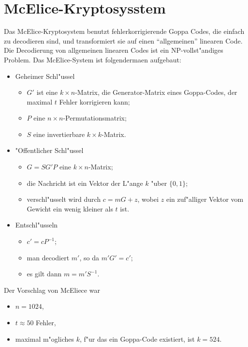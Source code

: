    \section{McElice-Kryptosysstem}
     Das McElice-Kryptosystem benutzt fehlerkorrigierende Goppa Codes, die einfach zu 
     decodieren sind, und transformiert sie auf einen "`allgemeinen"' linearen Code. 
     Die Decodierung von allgemeinen linearen Codes ist ein NP-vollst"andiges Problem. 
     Das McElice-System ist folgenderma\3en aufgebaut:
     \begin{itemize}
       \item Geheimer Schl"ussel
         \begin{itemize}
           \item $G'$ ist eine $k\times n$-Matrix, die Generator-Matrix eines Goppa-Codes, 
                 der maximal $t$ Fehler korrigieren kann;
           \item $P$ eine $n\times n$-Permutationsmatrix;
           \item $S$ eine invertierbare $k\times k$-Matrix.
         \end{itemize}
       \item "Offentlicher Schl"ussel
         \begin{itemize}
           \item $G=S G' P$ eine $k\times n$-Matrix;
           \item die Nachricht ist ein Vektor der L"ange $k$ "uber $\{0,1\}$;
           \item verschl"usselt wird durch $c = mG + z$, wobei $z$ ein zuf"alliger Vektor vom Gewicht ein
             wenig kleiner als $t$ ist.
         \end{itemize}
       \item Entschl"usseln
          \begin{itemize}
            \item $c' = c P^{-1}$;
            \item man decodiert $m'$, so da\3 $m'G'=c'$;
            \item es gilt dann $m = m'S^{-1}$.
          \end{itemize}
      \end{itemize}
      Der Vorschlag von McEliece war
      \begin{itemize}
         \item $n = 1024$,
         \item $t \approx 50$ Fehler,
         \item maximal m"ogliches $k$, f"ur das ein Goppa-Code existiert, ist  $k=524$.
      \end{itemize}
